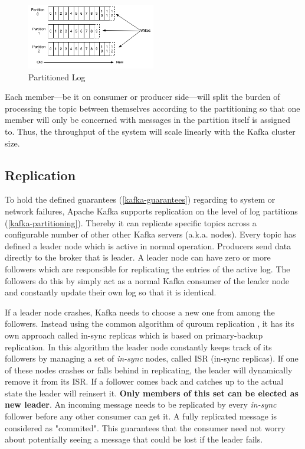 \begin{figure}[H]
    \centering
    \includegraphics[width=0.5\textwidth]{images/log_anatomy.png}
    \caption{Partitioned Log \cite{apachekafka}}
    \label{fig:the-log}
\end{figure}

Each member---be it on consumer or producer side---will split the burden of
processing the topic between themselves according to the partitioning so that
one member will only be concerned with messages in the partition itself is
assigned to. Thus, the throughput of the system will scale linearly with the
Kafka cluster size. \cite{apachekafka}


\subsection{Replication}
\label{kafka-replication}
To hold the defined guarantees (\ref{kafka-guarantees}) regarding to system
or network failures, Apache Kafka supports \gls{replication} on the level of log
partitions (\ref{kafka-partitioning}). Thereby it can replicate specific topics
across a configurable number of other other Kafka servers (a.k.a. nodes). Every
topic has defined a leader node which is active in normal operation. Producers
send data directly to the broker that is leader. A leader node can have zero or
more followers which are responsible for replicating the entries of the active
log. The followers do this by simply act as a normal Kafka consumer of the
leader node and constantly update their own log so that it is identical.
\cite{apachekafka}


If a leader node crashes, Kafka needs to choose a new one from among the
followers. Instead using the common algorithm of quroum replication , it
has its own approach called in-sync replicas which is based on primary-backup
replication. In this algorithm the leader node
constantly keeps track of its followers by managing a set of \textit{in-sync}
nodes, called ISR (in-sync replicas). If one of these nodes crashes or falls
behind in replicating, the leader will dynamically remove it from its ISR. If a
follower comes back and catches up to the actual state the leader will reinsert
it. \textbf{Only members of this set can be elected as new leader}. An incoming
message needs to be replicated by every \textit{in-sync} follower before any
other consumer can get it. A fully replicated message is considered as
"commited". This guarantees that the consumer need not worry about potentially
seeing a message that could be lost if the leader fails. \cite{apachekafka}
\cite{kafka-wiki-replication}

